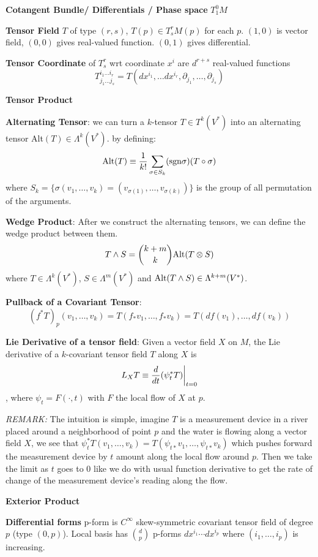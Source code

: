 \documentclass[12pt]{article}
\begin{document}
\textbf{Cotangent Bundle/ Differentials / Phase space} $T^0_1M$

\textbf{Tensor Field} $T$ of type $(r,s)$, $T(p) \in T^r_s M (p)$ for each $p$. $(1,0)$  is vector field, $(0,0)$ gives real-valued function. $(0, 1)$ gives differential.

\textbf{Tensor Coordinate} of $T^r_s$ wrt coordinate $x^i$ are $d^{r+s}$ real-valued functions $$T^{i_1\ldots i_r}_{j_1\ldots j_s} = T(dx^{i_1}, \ldots dx^{i_r}, \partial_{j_1}, \ldots , \partial_{j_s})$$

\textbf{Tensor Product}

\textbf{Alternating Tensor}: we can turn a $k$-tensor $T\in T^k(V^*)$ into an alternating tensor Alt$(T) \in \Lambda^k(V^*)$. by defining:
$$ \textnormal{Alt}(T) \equiv \frac{1}{k!} \sum_{\sigma \in S_k} (\textnormal{sgn} \sigma) (T\circ \sigma)$$
where $S_k = \{\sigma(v_{1}, \ldots, v_k) = (v_{\sigma(1)}, \ldots, v_{\sigma(k)})\}$ is the group of all permutation of the arguments. 


\textbf{Wedge Product}: After we construct the alternating tensors, we can define the wedge product between them.
$$ T\wedge S = \binom{k+m}{k} \textnormal{Alt}(T \otimes S)$$
where $T \in \Lambda^k(V^*)$, $S\in \Lambda^m(V^*)$ and $\textnormal{Alt}(T\wedge S) \in \Lambda^{k+m}(V^*)$.

\textbf{Pullback of a Covariant Tensor}: $$(f^* T)_p(v_1,\ldots, v_k) = T(f_* v_1, \ldots, f_* v_k) = T(df(v_1),\ldots, df(v_k))$$

\textbf{Lie Derivative of a tensor field}: Given a vector field $X$ on $M$, the Lie derivative of a $k$-covariant tensor field $T$ along $X$ is $$ L_XT \equiv \frac{d}{dt} (\psi_t^* T)\bigg{\rvert}_{t=0}$$, where $\psi_t = F(\cdot, t)$ with $F$ the local flow of $X$ at $p$.

\textit{REMARK:} The intuition is simple, imagine $T$ is a measurement device in a river placed around a neighborhood of point $p$ and the water is flowing along a vector field $X$, we see that $\psi_t^*T(v_1,\ldots, v_k) = T(\psi_{t*}v_1, \ldots, \psi_{t*} v_k)$ which pushes forward the measurement device by $t$ amount along the local flow around $p$. Then we take the limit as $t$ goes to 0 like we do with usual function derivative to get the rate of change of the measurement device's reading along the flow. 


\textbf{Exterior Product}

\textbf{Differential forms} p-form is $C^\infty$ skew-symmetric covariant tensor field of degree $p$ (type $(0,p)$). Local basis has ${d \choose p}$ p-forms $dx^{i_1}\cdots dx^{i_p}$ where $(i_1,\ldots,i_p)$ is increasing.
\end{document}
